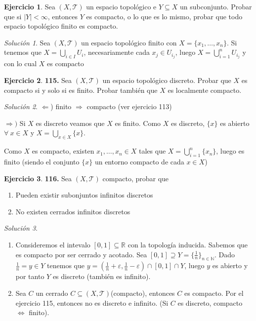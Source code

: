 \documentclass[12pt,twoside]{report}
\newcommand\mc[1]{\mathcal{#1}}
\theoremstyle{azul}
\theoremstyle{azul2}
\theoremstyle{plain}
\theoremstyle{definition}
\newtheorem*{ejer}{Ejercicio}
\theoremstyle{remark}
\newtheorem*{sol}{Solución}
\begin{document}
\begin{ejer}
Sea $(X,\mc{T})$ un espacio topológico e $Y\subseteq X$ un subconjunto. Probar que si $|Y|<\infty$, entonces $Y$ es compacto, o lo que es lo mismo, probar que todo espacio topológico finito es compacto.
\end{ejer}
\begin{sol}
Sea $(X,\mc{T})$ un espacio topológico finito con $X=\{x_1,\ldots,x_n\}$. Si tenemos que $X=\underset{i\in I}{\bigcup}U_i$, necesariamente cada $x_j\in U_{i_j}$, luego $X=\bigcup_{i=1}^n U_{i_j}$ y con lo cual $X$ es compacto
\end{sol}
\begin{ejer}\textbf{115.}
Sea $(X,\mc{T})$ un espacio topológico discreto. Probar que $X$ es compacto si y solo si es finito. Probar también que $X$ es localmente compacto.
\end{ejer}
\begin{sol}\:\vspace{-5mm}

    \item$\Leftarrow$) finito $\Rightarrow$ compacto (ver ejercicio 113)

\item $\Rightarrow)$ Si $X$ es discreto veamos que $X$ es finito. Como $X$ es discreto, $\{x\}$ es abierto $\forall \: x \in X$ y $X=\underset{x \in X}{\bigcup}\{x\}$.   

Como $X$ es compacto, existen $x_1,\ldots, x_n\in X$ tales que $X=\bigcup_{i=1}^n\{x_n\}$, luego es finito (siendo el conjunto $\{x\}$ un entorno compacto de cada $x\in X$)

\end{sol}
\begin{ejer}
    \textbf{116.} Sea $(X,\mc{T})$ compacto, probar que 
    \begin{enumerate}
        \item Pueden existir subonjuntos infinitos discretos
        \item No existen cerrados infinitos discretos
    \end{enumerate}
\end{ejer}
\begin{sol}
    \begin{enumerate}
        \item Consideremos el intevalo $[0,1]\subseteq\mathbb{R}$ con la topología inducida. Sabemos que es compacto por ser cerrado y acotado. Sea $[0,1]\supseteq Y=\{\frac{1}{n}\}_{n\in\mathbb{N}}$. Dado $\frac{1}{n}=y\in Y$ tenemos que $y=\left(\frac{1}{n}+\varepsilon,\frac{1}{n}-\varepsilon\right)\cap [0,1]\cap Y$, luego $y$ es abierto y por tanto $Y$ es discreto (también es infinito).
        \item Sea $C$ un cerrado $C \subseteq (X, \mc{T})$(compacto), entonces $C$ es compacto. Por el ejercicio 115, entonces no es discreto e infinito. (Si $C$ es discreto, compacto $\Leftrightarrow$ finito).
    \end{enumerate}
\end{sol}
\end{document}
